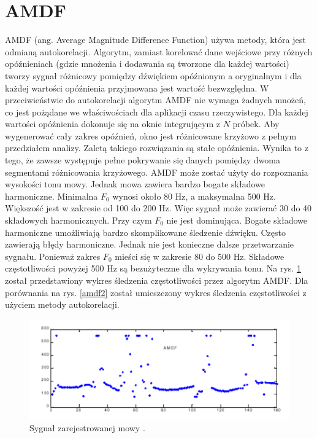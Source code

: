  \section{{AMDF}}
 AMDF \cite{AMDF} (ang. Average  Magnitude Difference Function) używa metody, która jest odmianą autokorelacji. Algorytm, zamiast korelować dane wejściowe przy różnych opóźnieniach (gdzie mnożenia i dodawania są tworzone dla każdej wartości) tworzy sygnał różnicowy pomiędzy dźwiękiem opóźnionym a oryginalnym i dla każdej wartości opóźnienia przyjmowana jest wartość bezwzględna. W przeciwieństwie do autokorelacji algorytm AMDF nie wymaga żadnych mnożeń, co jest pożądane we właściwościach dla aplikacji czasu rzeczywistego. Dla każdej wartości opóźnienia dokonuje się na oknie integrującym z $N$ próbek. Aby wygenerować cały zakres opóźnień, okno jest różnicowane krzyżowo z pełnym przedziałem analizy. Zaletą takiego rozwiązania są stałe opóźnienia. Wynika to z tego, że zawsze występuje pełne pokrywanie się danych pomiędzy dwoma segmentami różnicowania krzyżowego. AMDF może zostać użyty do rozpoznania wysokości tonu mowy. Jednak mowa zawiera bardzo bogate składowe harmoniczne. Minimalna $F_0$ wynosi około 80 Hz, a maksymalna 500 Hz. Większość jest w zakresie od 100 do 200 Hz. Więc sygnał może zawierać 30 do 40 składowych harmonicznych. Przy czym $F_0$ nie jest dominująca. Bogate składowe harmoniczne umożliwiają bardzo skomplikowane śledzenie dźwięku. Często zawierają błędy harmoniczne. Jednak nie jest konieczne dalsze przetwarzanie sygnału. Ponieważ zakres $F_0$ mieści się w zakresie 80 do 500 Hz. Składowe częstotliwości powyżej 500 Hz są bezużyteczne dla wykrywania tonu.
 Na rys. \ref{amdf1} został przedstawiony wykres śledzenia częstotliwości przez algorytm AMDF.  Dla porównania na rys. \ref{amdf2} został umieszczony wykres śledzenia częstotliwości z użyciem metody autokorelacji.
 
   \begin{figure}[h!]
  \centering
  \includegraphics[width=0.7\linewidth]{rys/amdf1}
  \caption{Sygnał zarejestrowanej mowy \cite{AMDF}.}
  \label{amdf1}
\end{figure}

